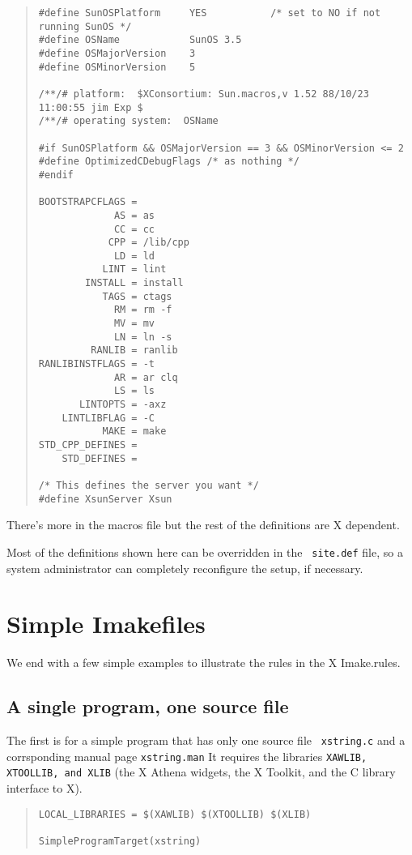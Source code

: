 \begin{quote}
\begin{verbatim}
#define SunOSPlatform     YES           /* set to NO if not running SunOS */
#define OSName            SunOS 3.5
#define OSMajorVersion    3
#define OSMinorVersion    5

/**/# platform:  $XConsortium: Sun.macros,v 1.52 88/10/23 11:00:55 jim Exp $
/**/# operating system:  OSName

#if SunOSPlatform && OSMajorVersion == 3 && OSMinorVersion <= 2
#define OptimizedCDebugFlags /* as nothing */
#endif

BOOTSTRAPCFLAGS = 
             AS = as
             CC = cc
            CPP = /lib/cpp
             LD = ld
           LINT = lint
        INSTALL = install
           TAGS = ctags
             RM = rm -f
             MV = mv
             LN = ln -s
         RANLIB = ranlib
RANLIBINSTFLAGS = -t
             AR = ar clq
             LS = ls
       LINTOPTS = -axz
    LINTLIBFLAG = -C
           MAKE = make
STD_CPP_DEFINES = 
    STD_DEFINES = 

/* This defines the server you want */
#define XsunServer Xsun
\end{verbatim}
\end{quote}

There's more in the macros file but the rest of the definitions are X
dependent.

Most of the definitions shown here can be overridden in the {\tt
site.def} file, so a system administrator can completely reconfigure
the setup, if necessary.

\section{Simple Imakefiles}

We end with a few simple examples to illustrate the rules in the X
Imake.rules.

\subsection{A single program, one source file}

The first is for a simple program that has only one source file {\tt
xstring.c} and a corrsponding manual page {\tt xstring.man} It
requires the libraries {\tt XAWLIB, XTOOLLIB, and XLIB} (the X Athena
widgets, the X Toolkit, and the C library interface to X).

\begin{quote}
\begin{verbatim}
LOCAL_LIBRARIES = $(XAWLIB) $(XTOOLLIB) $(XLIB)

SimpleProgramTarget(xstring)
\end{verbatim}
\end{quote}

